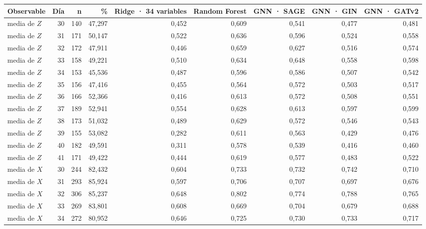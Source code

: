 \begin{table}[htbp]
    \centering
    {\footnotesize
    \begin{tabular}{@{}lrrrrrrrr@{}}
        \toprule
        \textbf{Observable} & \textbf{Día} & \textbf{n} & \textbf{\%} & \textbf{Ridge · 34 variables} & \textbf{Random Forest} & \textbf{GNN · SAGE} & \textbf{GNN · GIN} & \textbf{GNN · GATv2} \\
        \midrule
        media de $Z$ & 30 & 140 & 47,297 & 0,452 & 0,609 & 0,541 & 0,477 & 0,481 \\
        media de $Z$ & 31 & 171 & 50,147 & 0,522 & 0,636 & 0,596 & 0,524 & 0,558 \\
        media de $Z$ & 32 & 172 & 47,911 & 0,446 & 0,659 & 0,627 & 0,516 & 0,574 \\
        media de $Z$ & 33 & 158 & 49,221 & 0,510 & 0,634 & 0,648 & 0,558 & 0,598 \\
        media de $Z$ & 34 & 153 & 45,536 & 0,487 & 0,596 & 0,586 & 0,507 & 0,542 \\
        media de $Z$ & 35 & 156 & 47,416 & 0,455 & 0,564 & 0,572 & 0,503 & 0,517 \\
        media de $Z$ & 36 & 166 & 52,366 & 0,416 & 0,613 & 0,572 & 0,508 & 0,551 \\
        media de $Z$ & 37 & 189 & 52,941 & 0,554 & 0,628 & 0,613 & 0,597 & 0,599 \\
        media de $Z$ & 38 & 173 & 51,032 & 0,489 & 0,629 & 0,572 & 0,546 & 0,543 \\
        media de $Z$ & 39 & 155 & 53,082 & 0,282 & 0,611 & 0,563 & 0,429 & 0,476 \\
        media de $Z$ & 40 & 182 & 49,591 & 0,311 & 0,578 & 0,539 & 0,416 & 0,460 \\
        media de $Z$ & 41 & 171 & 49,422 & 0,444 & 0,619 & 0,577 & 0,483 & 0,522 \\
        media de $X$ & 30 & 244 & 82,432 & 0,604 & 0,733 & 0,732 & 0,742 & 0,710 \\
        media de $X$ & 31 & 293 & 85,924 & 0,597 & 0,706 & 0,707 & 0,697 & 0,676 \\
        media de $X$ & 32 & 306 & 85,237 & 0,648 & 0,802 & 0,774 & 0,788 & 0,765 \\
        media de $X$ & 33 & 269 & 83,801 & 0,608 & 0,669 & 0,704 & 0,679 & 0,688 \\
        media de $X$ & 34 & 272 & 80,952 & 0,646 & 0,725 & 0,730 & 0,733 & 0,717 \\

\end{tabular}}
\end{table}
